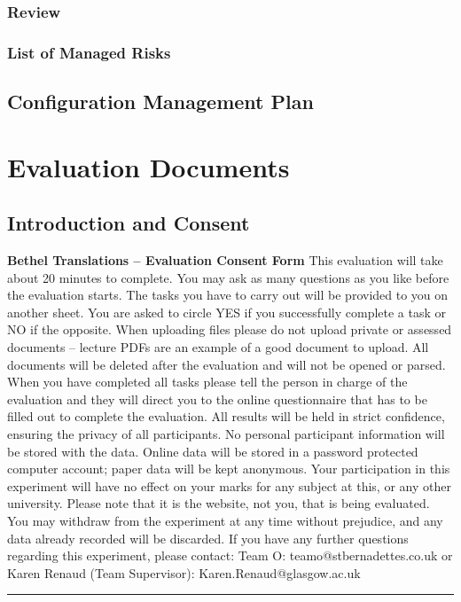 \documentclass{l3proj}
\begin{document}
\subsection{Review}
\subsection{List of Managed Risks}

\section{Configuration Management Plan}
\label{sect:conf-man}


\chapter{Evaluation Documents}
\label{chap:eval-docs}
\section{Introduction and Consent}
\label{sect:intro-cons}
\textbf{Bethel Translations – Evaluation Consent Form}\newline
This evaluation will take about 20 minutes to complete. 
You may ask as many questions as you like before the evaluation starts. The tasks you have to carry out will be provided to you on another sheet. You are asked to circle YES if you successfully complete a task or NO if the opposite.\newline
When uploading files please do not upload private or assessed documents – lecture PDFs are an example of a good document to upload. All documents will be deleted after the evaluation and will not be opened or parsed.\newline
When you have completed all tasks please tell the person in charge of the evaluation and they will direct you to the online questionnaire that has to be filled out to complete the evaluation.
All results will be held in strict confidence, ensuring the privacy of all participants. No personal participant information will be stored with the data. Online data will be stored in a password protected computer account; paper data will be kept anonymous. 
 Your participation in this experiment will have no effect on your marks for any subject at this, or any other university. \newline
Please note that it is the website, not you, that is being evaluated. You may withdraw from the experiment at any time without prejudice, and any data already recorded will be discarded. \newline If you have any further questions regarding this experiment, please contact: \newline
Team O:  teamo@stbernadettes.co.uk \newline
		or \newline
Karen Renaud (Team Supervisor): Karen.Renaud@glasgow.ac.uk\newline
\rule{430pt}{1pt}
\end{document}
